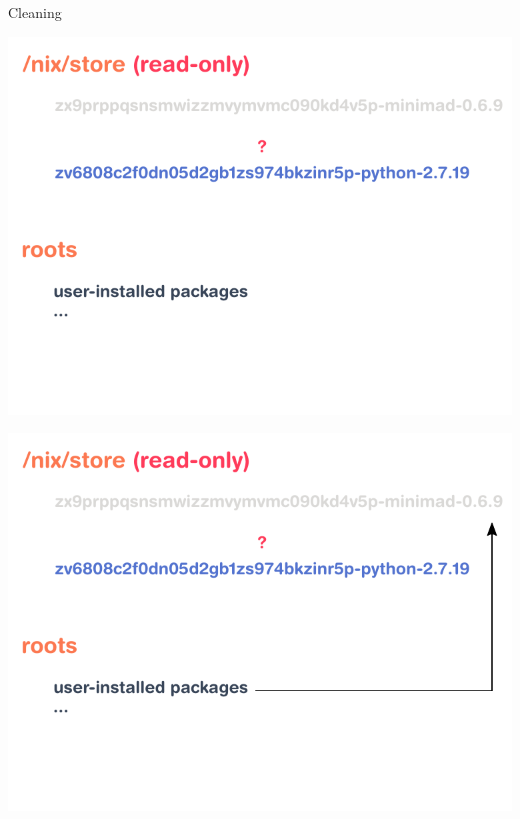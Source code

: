 \documentclass[aspectratio=169]{beamer}
\begin{document}
\begin{frame}{Cleaning}
     {
        \begin{center}
            \includegraphics[height=0.98\textheight]{img/schema-nix-store-cleaning-roots.pdf}
        \end{center}
    }
     {
        \begin{center}
            \includegraphics[height=0.98\textheight]{img/schema-nix-store-gc-1.pdf}
        \end{center}
    }
     {
        \begin{center}

\end{center}}
\end{frame}
\end{document}

